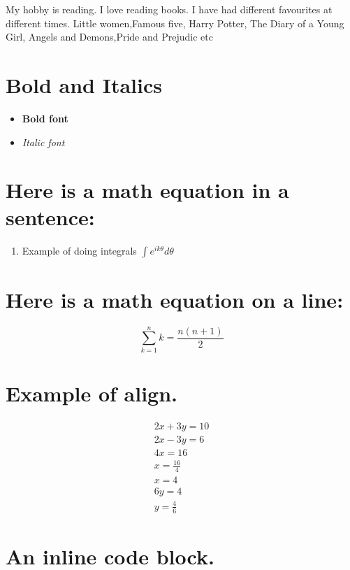 \documentclass{article}
\begin{document}
My hobby is reading. I love reading books. I have had different favourites at different times. Little women,Famous five, Harry Potter, The Diary of a Young Girl, Angels and Demons,Pride and Prejudic etc

\section*{Bold and Italics}
\begin{itemize}
\item \textbf {Bold font}
\item \textit {Italic font}
\end{itemize}



\section*{Here is a math equation in a sentence:}




\begin{enumerate}
\item Example of doing integrals $\int e^{i k \theta} d \theta$
\end{enumerate}


\section*{Here is a math equation on a line:}


\begin{equation}
\sum_{k=1}^{n} k= \frac {n (n+1)}{2}
\end{equation}



\section*{Example of align.}



\begin{align}
2x+3y=10\\
2x-3y=6\\
4x=16\\
x=\frac {16}{4}\\
x=4\\
6y=4\\
y=\frac {4}{6}
\end{align}


\section*{An inline code block.}
\end{document}
